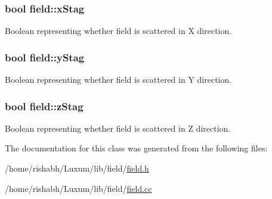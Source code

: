 \subsubsection[{\texorpdfstring{x\+Stag}{xStag}}]{\setlength{\rightskip}{0pt plus 5cm}bool field\+::x\+Stag}\hypertarget{classfield_a4d1be454f3b483fb3f8da288707444f5}{}\label{classfield_a4d1be454f3b483fb3f8da288707444f5}
Boolean representing whether field is scattered in X direction. 
\subsubsection[{\texorpdfstring{y\+Stag}{yStag}}]{\setlength{\rightskip}{0pt plus 5cm}bool field\+::y\+Stag}\hypertarget{classfield_a703fbdda5fa225af078af1d4dfedeeda}{}\label{classfield_a703fbdda5fa225af078af1d4dfedeeda}
Boolean representing whether field is scattered in Y direction. 
\subsubsection[{\texorpdfstring{z\+Stag}{zStag}}]{\setlength{\rightskip}{0pt plus 5cm}bool field\+::z\+Stag}\hypertarget{classfield_aa69f393bb8e443c1f4c4eb845a822539}{}\label{classfield_aa69f393bb8e443c1f4c4eb845a822539}
Boolean representing whether field is scattered in Z direction. 

The documentation for this class was generated from the following files\+:\begin{DoxyCompactItemize}
\item 
/home/rishabh/\+Luxum/lib/field/\hyperlink{field_8h}{field.\+h}\item 
/home/rishabh/\+Luxum/lib/field/\hyperlink{field_8cc}{field.\+cc}\end{DoxyCompactItemize}
